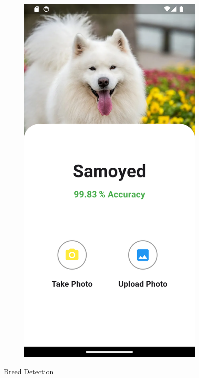 \begin{figure}[ht]
\begin{subfigure}{0.45\textwidth}
    \label{subfig:3}
  \end{subfigure}%
  \hfill
  \begin{subfigure}{0.45\textwidth}
    \includegraphics[width=\linewidth]{img/dog7.png}
    \label{subfig:4}
  \end{subfigure}
  \caption{Breed Detection}
  \label{fig:UI Breed Detection}
  \end{figure}
\newpage

